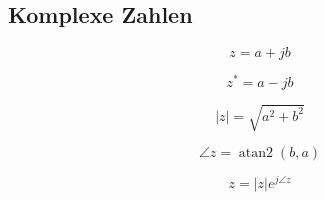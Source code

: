 \subsection{ Komplexe Zahlen}

\[
z=a+jb
\]

\[
z^*=a-jb
\]

\[
|z|
=
\sqrt{a^2+b^2}
\]

\[
\angle z
=
\operatorname{atan2}(b,a)
\]

\[
z
=
|z|e^{j\angle z}
\]